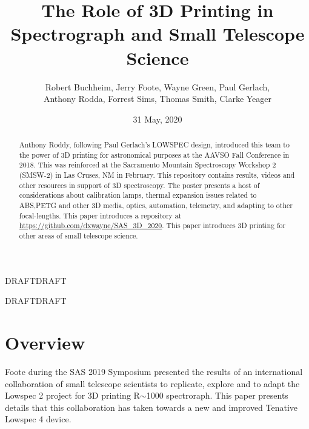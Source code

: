 \documentclass[letter,11pt,oneside]{article}
\def\documentisdraft{DRAFT}  %
\def\drafttest{DRAFT}
\newcommand{\newlowspec}{Tenative Lowspec 4}
\newcommand{\github}{\url{https://github.com/dxwayne/SAS_3D_2020}}
\begin{document}


\title{The Role of 3D Printing in Spectrograph and Small Telescope Science}
\author{Robert Buchheim, Jerry Foote, Wayne Green, Paul Gerlach, \\
  Anthony Rodda, Forrest Sims, Thomas Smith, Clarke Yeager}
\date{31 May, 2020}
\maketitle

\begin{abstract}
   Anthony Roddy, following Paul Gerlach's LOWSPEC design, introduced
   this team to the power of 3D printing for astronomical purposes at
   the AAVSO Fall Conference in 2018. This was reinforced at the
   Sacramento Mountain Spectroscopy Workshop 2 (SMSW-2) in Las Cruses,
   NM in February. This repository contains results, videos and other
   resources in support of 3D spectroscopy. The poster presents a host
   of considerations about calibration lamps, thermal expansion issues
   related to ABS,PETG and other 3D media, optics, automation,
   telemetry, and adapting to other focal-lengths. This paper
   introduces a repository at \github. This paper introduces 3D
   printing for other areas of small telescope science.
\end{abstract}

\ifx\documentisdraft\drafttest
\renewcommand*\contentsname{REMOVE CONTENTS FROM PAPER}
\tableofcontents
\listoffigures
\listoftables
\newpage
\fi


\setcounter{section}{0}

\ifx\documentisdraft\drafttest
\linenumbers    %
\fi

\section{Overview}

Foote \cite{Lowspec2} during the SAS 2019 Symposium presented the
results of an international collaboration of small telescope scientists
to replicate, explore and to adapt the Lowspec 2 project \cite{Gerlach}
for 3D printing R$\sim$1000 spectroraph. This paper presents details
that this collaboration has taken towards a new and improved \newlowspec
device.
\end{document}
